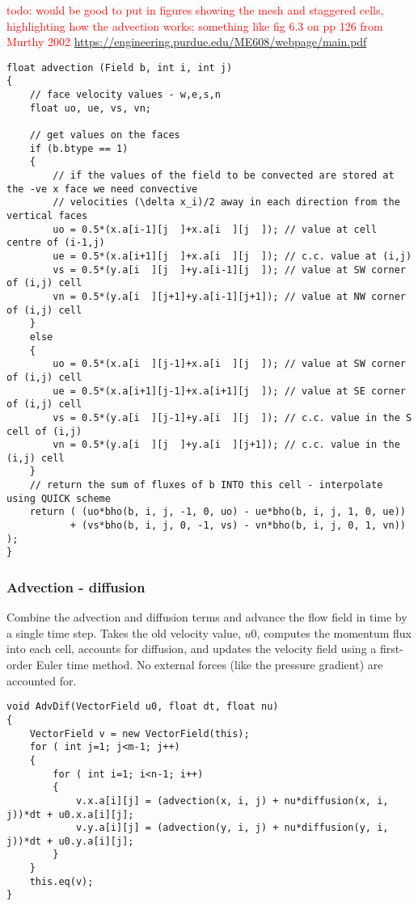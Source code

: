 \documentclass[notitlepage]{article}
\begin{document}
\textcolor{red}{todo: would be good to put in figures showing the mesh and staggered cells, highlighting how
	the advection works; something like fig 6.3 on pp 126 from Murthy 2002 \url{https://engineering.purdue.edu/ME608/webpage/main.pdf}}

\begin{lstlisting}[style=myCpp]
float advection (Field b, int i, int j)
{
	// face velocity values - w,e,s,n
	float uo, ue, vs, vn;
	
	// get values on the faces
	if (b.btype == 1)
	{
		// if the values of the field to be convected are stored at the -ve x face we need convective
		// velocities (\delta x_i)/2 away in each direction from the vertical faces
		uo = 0.5*(x.a[i-1][j  ]+x.a[i  ][j  ]); // value at cell centre of (i-1,j)
		ue = 0.5*(x.a[i+1][j  ]+x.a[i  ][j  ]); // c.c. value at (i,j)
		vs = 0.5*(y.a[i  ][j  ]+y.a[i-1][j  ]); // value at SW corner of (i,j) cell
		vn = 0.5*(y.a[i  ][j+1]+y.a[i-1][j+1]); // value at NW corner of (i,j) cell
	}
	else
	{
		uo = 0.5*(x.a[i  ][j-1]+x.a[i  ][j  ]); // value at SW corner of (i,j) cell
		ue = 0.5*(x.a[i+1][j-1]+x.a[i+1][j  ]); // value at SE corner of (i,j) cell
		vs = 0.5*(y.a[i  ][j-1]+y.a[i  ][j  ]); // c.c. value in the S cell of (i,j)
		vn = 0.5*(y.a[i  ][j  ]+y.a[i  ][j+1]); // c.c. value in the (i,j) cell
	}
	// return the sum of fluxes of b INTO this cell - interpolate using QUICK scheme
	return ( (uo*bho(b, i, j, -1, 0, uo) - ue*bho(b, i, j, 1, 0, ue))
		   + (vs*bho(b, i, j, 0, -1, vs) - vn*bho(b, i, j, 0, 1, vn)) );
}
\end{lstlisting}

\subsubsection{Advection - diffusion}

Combine the advection and diffusion terms and advance the flow field in time by
a single time step.
Takes the old velocity value, $u0$, computes the momentum flux into each cell,
accounts for diffusion, and updates the velocity field using a first-order
Euler time method. No external forces (like the pressure gradient) are accounted for.

\begin{lstlisting}[style=myCpp]
void AdvDif(VectorField u0, float dt, float nu)
{
	VectorField v = new VectorField(this);
	for ( int j=1; j<m-1; j++)
	{
		for ( int i=1; i<n-1; i++)
		{
			v.x.a[i][j] = (advection(x, i, j) + nu*diffusion(x, i, j))*dt + u0.x.a[i][j];
			v.y.a[i][j] = (advection(y, i, j) + nu*diffusion(y, i, j))*dt + u0.y.a[i][j];
		}
	}
	this.eq(v);   
}
\end{lstlisting}
\end{document}

